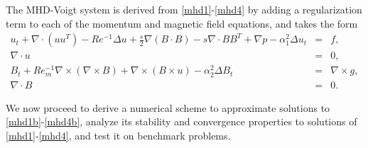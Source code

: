 \documentclass[11pt]{article}%
\numberwithin{equation}{section}
\begin{document}
The MHD-Voigt system is derived from \eqref{mhd1}-\eqref{mhd4} by adding a regularization term to each of the momentum and magnetic field equations, and takes the form
\begin{eqnarray}
u_t + \nabla \cdot (uu^{T}) - Re^{-1}\Delta u + \frac{s}{2}\nabla(B\cdot B) - s\nabla \cdot{BB^T} + \nabla p - \alpha_1^2\Delta u_t & = & f, \label{mhd1b}\\
\nabla \cdot u & = & 0, \label{mhd2b} \\
B_t + Re_m^{-1}\nabla\times(\nabla \times B) + \nabla \times(B\times u)  -\alpha_2^2 \Delta B_t & = & \nabla \times g, \label{mhd3b} \\
\nabla \cdot B & = & 0. \label{mhd4b}
\end{eqnarray}



We now proceed to derive a numerical scheme to approximate solutions to \eqref{mhd1b}-\eqref{mhd4b}, analyze its stability and convergence properties to solutions of \eqref{mhd1}-\eqref{mhd4}, and test it on benchmark problems.
\end{document}
